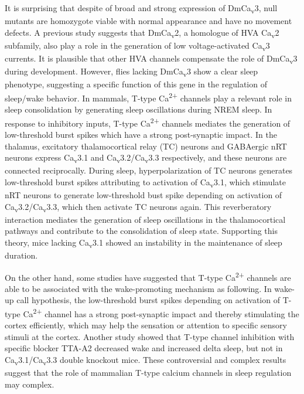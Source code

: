 It is surprising that despite of broad and strong expression of DmCa\textsubscript{v}3, null mutants are homozygote viable with normal appearance and have no movement defects.
A previous study suggests that DmCa\textsubscript{v}2, a homologue of HVA Ca\textsubscript{v}2 subfamily, also play a role in the generation of low voltage-activated Ca\textsubscript{v}3 currents\cite{Ryglewski:2012jk}.
It is plausible that other HVA channels compensate the role of DmCa\textsubscript{v}3 during development.
However, flies lacking DmCa\textsubscript{v}3 show a clear sleep phenotype, suggesting a specific function of this gene in the regulation of sleep/wake behavior.
In mammals, T-type Ca\textsuperscript{2+} channels play a relevant role in sleep consolidation by generating sleep oscillations during NREM sleep.
In response to inhibitory inputs, T-type Ca\textsuperscript{2+} channels mediates the generation of low-threshold burst spikes which have a strong post-synaptic impact.
In the thalamus, excitatory thalamocortical relay (TC) neurons and GABAergic nRT neurons express Ca\textsubscript{v}3.1 and Ca\textsubscript{v}3.2/Ca\textsubscript{v}3.3 respectively, and these neurons are connected reciprocally.
During sleep, hyperpolarization of TC neurons generates low-threshold burst spikes attributing to activation of Ca\textsubscript{v}3.1, which stimulate nRT neurons to generate low-threshold bust spike depending on activation of Ca\textsubscript{v}3.2/Ca\textsubscript{v}3.3, which then activate TC neurons again.
This reverberatory interaction mediates the generation of sleep oscillations in the thalamocortical pathways and contribute to the consolidation of sleep state.
Supporting this theory, mice lacking Ca\textsubscript{v}3.1 showed an instability in the maintenance of sleep duration\cite{Lee:2004ey}.

On the other hand, some studies have suggested that T-type Ca\textsuperscript{2+} channels are able to be associated with the wake-promoting mechanism as following.
In wake-up call hypothesis, the low-threshold burst spikes depending on activation of T-type Ca\textsuperscript{2+} channel has a strong post-synaptic impact and thereby stimulating the cortex efficiently\cite{swadlow:2001aa}, which may help the sensation or attention to specific sensory stimuli at the cortex.
Another study showed that T-type channel inhibition with specific blocker TTA-A2 decreased wake and increased delta sleep, but not in Ca\textsubscript{v}3.1/Ca\textsubscript{v}3.3 double knockout mice\cite{kraus:2010aa}. These controversial and complex results suggest that the role of mammalian T-type calcium channels in sleep regulation may complex. 

